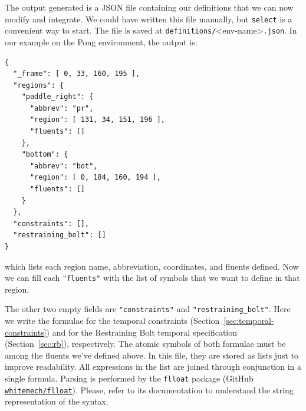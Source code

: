 The output generated is a JSON file containing our definitions that we can now
modify and integrate. We could have written this file manually, but
\texttt{select} is a convenient way to start. The file is saved at
\texttt{definitions/}<env-name>\texttt{.json}. In our example on the Pong
environment, the output is:
\begin{lstlisting}
{
  "_frame": [ 0, 33, 160, 195 ],
  "regions": {
    "paddle_right": {
      "abbrev": "pr",
      "region": [ 131, 34, 151, 196 ],
      "fluents": []
    },
    "bottom": {
      "abbrev": "bot",
      "region": [ 0, 184, 160, 194 ],
      "fluents": []
    }
  },
  "constraints": [],
  "restraining_bolt": []
}
\end{lstlisting}
which lists each region name, abbreviation, coordinates, and fluents defined.
Now we can fill each \verb|"fluents"| with the list of symbols that we want to
define in that region.

The other two empty fields are \verb|"constraints"| and
\verb|"restraining_bolt"|. Here we write the \ldl{} formulae for the temporal
constraints (Section~\ref{sec:temporal-constraints}) and for the Restraining
Bolt temporal specification (Section~\ref{sec:rb}), respectively. The atomic
symbols of both formulae must be among the fluents we've defined above. In
this file, they are stored as lists just to improve readability. All
expressions in the list are joined through conjunction in a single \ldl{}
formula. Parsing is performed by the \texttt{flloat} package (GitHub
\href{https://github.com/whitemech/flloat}{\texttt{whitemech/flloat}}).
Please, refer to its documentation to understand the string representation of
the \ldl{} syntax.


